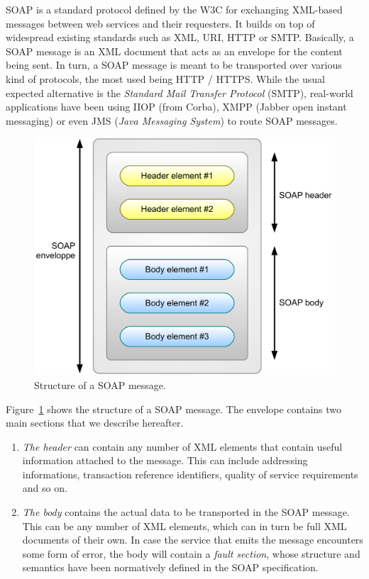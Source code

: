 SOAP \cite{MGMH+03} is a standard protocol defined by the W3C for exchanging XML-based messages between web services and their requesters. It builds on top of widespread existing standards such as XML, URI, HTTP or SMTP. Basically, a SOAP message is an XML document that acts as an envelope for the content being sent. In turn, a SOAP message is meant to be transported over various kind of protocols, the most used being HTTP / HTTPS. While the usual expected alternative is the \emph{Standard Mail Transfer Protocol} (SMTP), real-world applications have been using IIOP (from Corba), XMPP (Jabber open instant messaging) or even JMS (\emph{Java Messaging System}) to route SOAP messages.\\

\begin{figure}[htbp]
    \centering
    \includegraphics[width=\textwidth]{content/web-services/soap-structure}
    \caption{Structure of a SOAP message.}
    \label{fig:soap-structure}
\end{figure}

Figure~\ref{fig:soap-structure} shows the structure of a SOAP message. The envelope contains two main sections that we describe hereafter.
\begin{enumerate}

    \item \emph{The header} can contain any number of XML elements that contain useful information attached to the message. This can include addressing informations, transaction reference identifiers, quality of service requirements and so on.
    
    \item \emph{The body} contains the actual data to be transported in the SOAP message. This can be any number of XML elements, which can in turn be full XML documents of their own. In case the service that emits the message encounters some form of error, the body will contain a \emph{fault section}, whose structure and semantics have been normatively defined in the SOAP specification.

\end{enumerate}\

